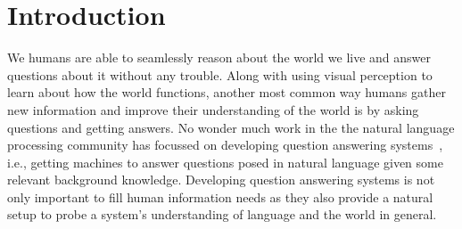 \documentclass[main.tex]{subfiles}
\begin{document}
\section{Introduction} %
\label{sec:introduction}

We humans are able to seamlessly reason about the world we live and answer questions about it without any trouble.
Along with using visual perception to learn about how the world functions, another most common way humans gather new information and improve their understanding of the world is by asking questions and getting answers.  No wonder much work in the the natural language processing community has focussed on developing question answering systems~\cite{voorhees-qa-1999,kwok-qa-2001}, i.e., getting machines to answer questions posed in natural language given some relevant background knowledge. Developing question answering systems is not only important to fill human information needs as they also provide a natural setup to probe a system's understanding of language and the world in general.


\end{document}

